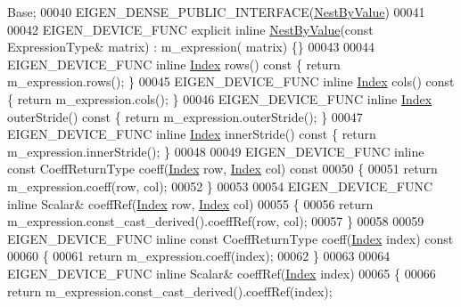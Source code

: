 \begin{DoxyCode}
       Base;
00040     EIGEN\_DENSE\_PUBLIC\_INTERFACE(\hyperlink{group___core___module_class_eigen_1_1_nest_by_value}{NestByValue})
00041 
00042     EIGEN\_DEVICE\_FUNC \textcolor{keyword}{explicit} \textcolor{keyword}{inline} \hyperlink{group___core___module_class_eigen_1_1_nest_by_value}{NestByValue}(\textcolor{keyword}{const} ExpressionType& matrix) : m\_expression(
      matrix) \{\}
00043 
00044     EIGEN\_DEVICE\_FUNC \textcolor{keyword}{inline} \hyperlink{namespace_eigen_a62e77e0933482dafde8fe197d9a2cfde}{Index} rows()\textcolor{keyword}{ const }\{ \textcolor{keywordflow}{return} m\_expression.rows(); \}
00045     EIGEN\_DEVICE\_FUNC \textcolor{keyword}{inline} \hyperlink{namespace_eigen_a62e77e0933482dafde8fe197d9a2cfde}{Index} cols()\textcolor{keyword}{ const }\{ \textcolor{keywordflow}{return} m\_expression.cols(); \}
00046     EIGEN\_DEVICE\_FUNC \textcolor{keyword}{inline} \hyperlink{namespace_eigen_a62e77e0933482dafde8fe197d9a2cfde}{Index} outerStride()\textcolor{keyword}{ const }\{ \textcolor{keywordflow}{return} m\_expression.outerStride(); \}
00047     EIGEN\_DEVICE\_FUNC \textcolor{keyword}{inline} \hyperlink{namespace_eigen_a62e77e0933482dafde8fe197d9a2cfde}{Index} innerStride()\textcolor{keyword}{ const }\{ \textcolor{keywordflow}{return} m\_expression.innerStride(); \}
00048 
00049     EIGEN\_DEVICE\_FUNC \textcolor{keyword}{inline} \textcolor{keyword}{const} CoeffReturnType coeff(\hyperlink{namespace_eigen_a62e77e0933482dafde8fe197d9a2cfde}{Index} row, \hyperlink{namespace_eigen_a62e77e0933482dafde8fe197d9a2cfde}{Index} col)\textcolor{keyword}{ const}
00050 \textcolor{keyword}{    }\{
00051       \textcolor{keywordflow}{return} m\_expression.coeff(row, col);
00052     \}
00053 
00054     EIGEN\_DEVICE\_FUNC \textcolor{keyword}{inline} Scalar& coeffRef(\hyperlink{namespace_eigen_a62e77e0933482dafde8fe197d9a2cfde}{Index} row, \hyperlink{namespace_eigen_a62e77e0933482dafde8fe197d9a2cfde}{Index} col)
00055     \{
00056       \textcolor{keywordflow}{return} m\_expression.const\_cast\_derived().coeffRef(row, col);
00057     \}
00058 
00059     EIGEN\_DEVICE\_FUNC \textcolor{keyword}{inline} \textcolor{keyword}{const} CoeffReturnType coeff(\hyperlink{namespace_eigen_a62e77e0933482dafde8fe197d9a2cfde}{Index} index)\textcolor{keyword}{ const}
00060 \textcolor{keyword}{    }\{
00061       \textcolor{keywordflow}{return} m\_expression.coeff(index);
00062     \}
00063 
00064     EIGEN\_DEVICE\_FUNC \textcolor{keyword}{inline} Scalar& coeffRef(\hyperlink{namespace_eigen_a62e77e0933482dafde8fe197d9a2cfde}{Index} index)
00065     \{
00066       \textcolor{keywordflow}{return} m\_expression.const\_cast\_derived().coeffRef(index);

\end{DoxyCode}
